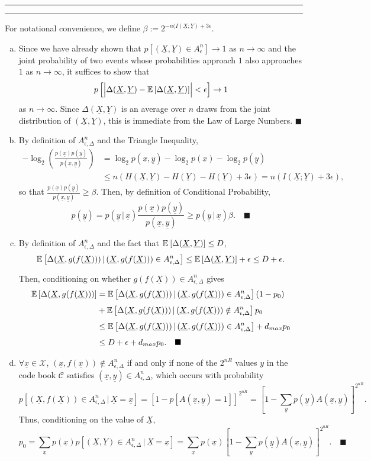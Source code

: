 \documentclass[11pt]{article}
\newcounter{questionCounter}
\newcounter{partCounter}[questionCounter]
\newenvironment{question}[2][\arabic{questionCounter}]{%
    \setcounter{partCounter}{0}%
    \vspace{.25in} \hrule \vspace{0.5em}%
        \noindent{\bf #2}%
    \vspace{0.8em} \hrule \vspace{.10in}%
    \addtocounter{questionCounter}{1}%
}{}
\renewcommand{\qed}{\quad $\blacksquare$}
\newcommand{\mqed}{\quad \blacksquare}
\newcommand{\ul}{\underline}
\newcommand{\X}{\mathcal{X}}
\newcommand{\pr}[1]{\mathsf{Pr}\left( #1 \right)} %
\newcommand{\E}[2]{\operatornamewithlimits{\mathbb{E}}_{#2}\left[ #1 \right]}
\newcommand{\giv}{\, | \,} %
\newcommand{\jtA}{A_{\epsilon,\Delta}^n} %
\begin{document}
\begin{question}{Problem 3}
For notational convenience, we define
$\beta := 2^{-n(I(\ul X;\ul Y) + 3\epsilon}$.
\begin{enumerate}[(a)]
\item Since we have already shown that
$p\left[ (\ul X, \ul Y) \in A_{\epsilon}^n \right] \rightarrow 1$ as
$n \rightarrow \infty$ and the joint probability of two events whose
probabilities approach $1$ also approaches $1$ as $n \rightarrow \infty$, it
suffices to show that
\[p\left[ \left| \Delta(\ul X, \ul Y)  - \E{\Delta(\ul X, \ul
Y)}{} \right| < \epsilon \right] \rightarrow 1\] as $n \rightarrow \infty$.
Since $\Delta(\ul X, \ul Y)$ is an average over $n$ draws from the joint
distribution of $(\ul X, \ul Y)$, this is immediate from the Law of Large
Numbers. \qed

\item By definition of $\jtA$ and the Triangle Inequality,
\begin{align*}
-\log_2\left( \frac{p(\ul x)p(\ul y)}{p(\ul x, \ul y)} \right)
 & = \log_2 p(\ul x, \ul y) - \log_2 p(\ul x) - \log_2 p(\ul y) \\
 & \leq n(H(\ul X, \ul Y) - H(\ul Y) - H(\ul Y) + 3\epsilon)
   = n(I(\ul X; \ul Y) + 3\epsilon),
\end{align*}
so that $\displaystyle \frac{p(\ul x)p(\ul y)}{p(\ul x, \ul y)} \geq \beta$.
Then, by definition of Conditional Probability,
\[p(\ul y)
 = p(\ul y \giv \ul x)\frac{p(\ul x)p(\ul y)}{p(\ul x, \ul y)}
 \geq p(\ul y \giv \ul x) \beta. \mqed\]

\item By definition of $\jtA$ and the fact that
$\E{\Delta(\ul X, \ul Y)}{} \leq D$,
\[
\E{\Delta(\ul X, g(f(\ul X))) \giv (\ul X, g(f(\ul X))) \in \jtA}{}
 \leq \E{\Delta(\ul X, \ul Y)}{} + \epsilon
 \leq D + \epsilon.
\]
Then, conditioning on whether $g(f(\ul X)) \in \jtA$ gives
\begin{align*}
\E{\Delta(\ul X, g(f(\ul X)))}{}
 & = \E{\Delta(\ul X, g(f(\ul X))) \giv (\ul X, g(f(\ul X))) \in \jtA}{} (1 - p_0) \\
 & + \E{\Delta(\ul X, g(f(\ul X))) \giv (\ul X, g(f(\ul X))) \notin \jtA}{}p_0 \\
 & \leq \E{\Delta(\ul X, g(f(\ul X))) \giv (\ul X, g(f(\ul X))) \in \jtA}{}
   + d_{max} p_0 \\
 & \leq D + \epsilon + d_{max} p_0. \mqed
\end{align*}

\item $\forall \ul x \in \X$, $(\ul x, f(\ul x)) \notin \jtA$ if and only if
none of the $2^{nR}$ values $y$ in the code book $\mathcal{C}$ satisfies
$(\ul x, \ul y) \in \jtA$, which occurs with probability
\[
  p\left[(\ul X, f(\ul X)) \in \jtA \giv \ul X = \ul x \right]
 = \left[1 -
        p\left[ A(\ul x, \ul y) = 1 \right] \right]^{2^{nR}}
 = \left[1 - \sum_{\ul y} p(\ul y) A(\ul x, \ul y) \right]^{2^{nR}}.
\]
Thus, conditioning on the value of $\ul X$,
\[
  p_0
 = \sum_{\ul x} p(\ul x)
                    p\left[(\ul X, \ul Y) \in \jtA \giv \ul X = \ul x \right]
 = \sum_{\ul x} p(\ul x)
            \left[ 1 - \sum_{\ul y} p(\ul y) A(\ul x, \ul y) \right]^{2^{nR}}.
    \mqed
\]


\end{enumerate}
\end{question}
\end{document}
